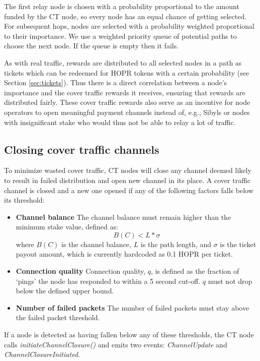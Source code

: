 The first relay node is chosen with a probability proportional to the amount funded by the CT node, so every node has an equal chance of getting selected. For subsequent hops, nodes are selected with a probability weighted proportional to their importance. We use a weighted priority queue of potential paths to choose the next node. If the queue is empty then it fails.

As with real traffic, rewards are distributed to all selected nodes in a path as tickets which can be redeemed for HOPR tokens with a certain probability (see Section \ref{sec:tickets}). Thus there is a direct correlation between a node's importance and the cover traffic rewards it receives, ensuring that rewards are distributed fairly. These cover traffic rewards also serve as an incentive for node operators to open meaningful payment channels instead of, e.g., Sibyls or nodes with insignificant stake who would thus not be able to relay a lot of traffic.


\subsection{Closing cover traffic channels}
To minimize wasted cover traffic, CT nodes will close any channel deemed likely to result in failed distribution and open new channel in its place. A cover traffic channel is closed and a new one opened if any of the following factors falls below its threshold:
  \begin{itemize}
      \item \textbf{Channel balance} The channel balance must remain higher than the minimum stake value, defined as:
      $$B(C) < L * \sigma$$
      where $B(C)$ is the channel balance, $L$ is the path length, and $\sigma$ is the ticket payout amount, which is currently hardcoded as 0.1 HOPR per ticket.
      \item \textbf{Connection quality} Connection quality, $q$, is defined as the fraction of `pings' the node has responded to within a 5 second cut-off. $q$ must not drop below the defined upper bound. 
      \item \textbf{Number of failed packets} The number of failed packets must stay above the failed packet threshold.
      $$ $$
  \end{itemize}
If a node is detected as having fallen below any of these thresholds, the CT node calls \textit{initiateChannelClosure()} and emits two events: \textit{ChannelUpdate} and \textit{ChannelClosureInitiated}.
